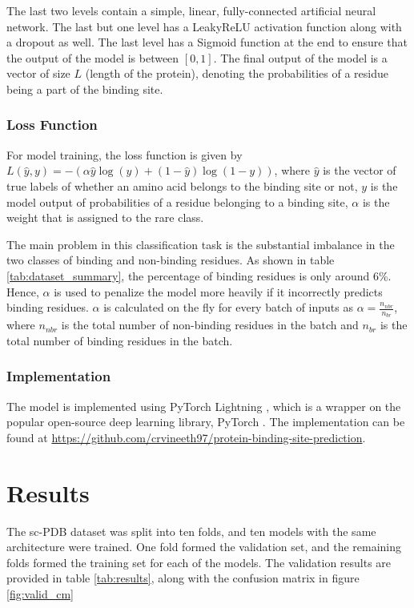 \documentclass[journal=jacsat,manuscript=article]{achemso}
\begin{document}
The last two levels contain a simple, linear, fully-connected artificial neural network. The last but one level has a LeakyReLU activation function along with a dropout as well. The last level has a Sigmoid function at the end to ensure that the output of the model is between $[0, 1]$. The final output of the model is a vector of size $L$ (length of the protein), denoting the probabilities of a residue being a part of the binding site.

\subsubsection{Loss Function}
\quad For model training, the loss function is given by
$L(\hat{y}, y) = -(\alpha\hat{y}\log(y) + (1-\hat{y})\log(1-y))$, where $\hat{y}$ is the vector of true labels of whether an amino acid belongs to the binding site or not, $y$ is the model output of probabilities of a residue belonging to a binding site, $\alpha$ is the weight that is assigned to the rare class.

The main problem in this classification task is the substantial imbalance in the two classes of binding and non-binding residues. As shown in table \ref{tab:dataset_summary}, the percentage of binding residues is only around 6\%. Hence, $\alpha$ is used to penalize the model more heavily if it incorrectly predicts binding residues. $\alpha$ is calculated on the fly for every batch of inputs as $\alpha = \frac{n_{nbr}}{n_{br}}$, where $n_{nbr}$ is the total number of non-binding residues in the batch and $n_{br}$ is the total number of binding residues in the batch.

\subsubsection{Implementation}
\quad The model is implemented using PyTorch Lightning \cite{falcon2019pytorch}, which is a wrapper on the popular open-source deep learning library, PyTorch \cite{NEURIPS2019_9015}. The implementation can be found at \href{https://github.com/crvineeth97/protein-binding-site-prediction}{https://github.com/crvineeth97/protein-binding-site-prediction}.

\newpage
\section{Results}
\quad The sc-PDB dataset was split into ten folds, and ten models with the same architecture were trained. One fold formed the validation set, and the remaining folds
formed the training set for each of the models. The validation results are provided in table \ref{tab:results}, along with the confusion matrix in figure \ref{fig:valid_cm}
\end{document}

